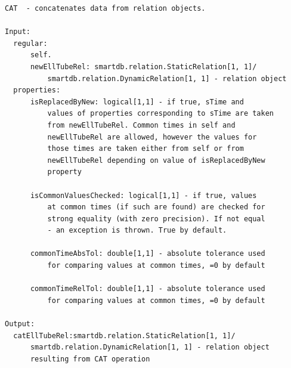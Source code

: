 \documentclass[letterpaper,10pt,english]{sphinxmanual}
\begin{document}
\begin{Verbatim}[commandchars=\\\{\}]
CAT  - concatenates data from relation objects.

Input:
  regular:
      self.
      newEllTubeRel: smartdb.relation.StaticRelation[1, 1]/
          smartdb.relation.DynamicRelation[1, 1] - relation object
  properties:
      isReplacedByNew: logical[1,1] - if true, sTime and
          values of properties corresponding to sTime are taken
          from newEllTubeRel. Common times in self and
          newEllTubeRel are allowed, however the values for
          those times are taken either from self or from
          newEllTubeRel depending on value of isReplacedByNew
          property

      isCommonValuesChecked: logical[1,1] - if true, values
          at common times (if such are found) are checked for
          strong equality (with zero precision). If not equal
          - an exception is thrown. True by default.

      commonTimeAbsTol: double[1,1] - absolute tolerance used
          for comparing values at common times, =0 by default

      commonTimeRelTol: double[1,1] - absolute tolerance used
          for comparing values at common times, =0 by default

Output:
  catEllTubeRel:smartdb.relation.StaticRelation[1, 1]/
      smartdb.relation.DynamicRelation[1, 1] - relation object
      resulting from CAT operation
\end{Verbatim}
\end{document}
